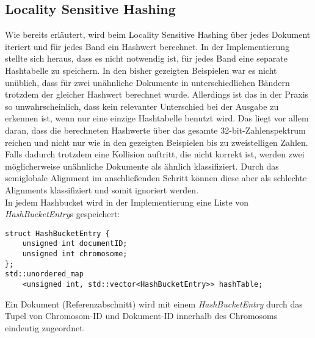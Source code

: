 \subsection{Locality Sensitive Hashing}
Wie bereits erläutert, wird beim Locality Sensitive Hashing über jedes Dokument iteriert und für jedes Band ein Hashwert berechnet.
In der Implementierung stellte sich heraus, dass es nicht notwendig ist, für jedes Band eine separate Hashtabelle zu speichern.
In den bisher gezeigten Beispielen war es nicht unüblich, dass für zwei unähnliche Dokumente in unterschiedlichen Bändern trotzdem der gleicher Hashwert berechnet wurde.
Allerdings ist das in der Praxis so unwahrscheinlich, dass kein relevanter Unterschied bei der Ausgabe zu erkennen ist, wenn nur eine einzige Hashtabelle benutzt wird.
Das liegt vor allem daran, dass die berechneten Hashwerte über das gesamte 32-bit-Zahlenspektrum reichen und nicht nur wie in den gezeigten Beispielen bis zu zweistelligen Zahlen.
Falls dadurch trotzdem eine Kollision auftritt, die nicht korrekt ist, werden zwei möglicherweise unähnliche Dokumente als ähnlich klassifiziert.
Durch das semiglobale Alignment im anschließenden Schritt können diese aber als schlechte Alignments klassifiziert und somit ignoriert werden.
\\
In jedem Hashbucket wird in der Implementierung eine Liste von \textit{HashBucketEntry}s gespeichert:
\begin{lstlisting}
struct HashBucketEntry {
    unsigned int documentID;
    unsigned int chromosome;
};
std::unordered_map
    <unsigned int, std::vector<HashBucketEntry>> hashTable;
\end{lstlisting}
Ein Dokument (Referenzabschnitt) wird mit einem \textit{HashBucketEntry} durch das Tupel von Chromosom-ID und Dokument-ID innerhalb des Chromosoms eindeutig zugeordnet.
